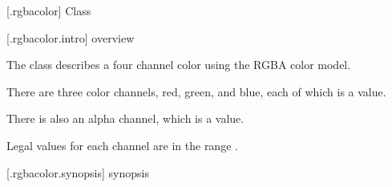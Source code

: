  [\iotwod.rgbacolor] {Class }

 [\iotwod.rgbacolor.intro] { overview}

\pnum
{}%
The class  describes a four channel color using the RGBA color model.

\pnum
There are three color channels, red, green, and blue, each of which is a  value.

\pnum
There is also an alpha channel, which is a  value.

\pnum
Legal values for each channel are in the range .

%
 [\iotwod.rgbacolor.synopsis] { synopsis}

